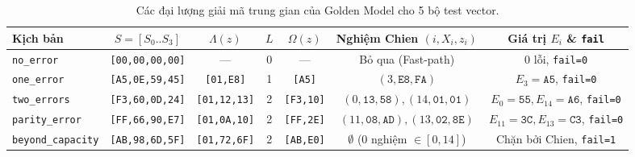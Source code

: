 \begin{table}[!htb]
\centering
\caption{Các đại lượng giải mã trung gian của Golden Model cho 5 bộ test vector.}
\label{tab:vectors_trace_summary}
\scriptsize
\setlength{\tabcolsep}{3.5pt}
\begin{tabular}{@{} l c c c c c c @{}}
\toprule
Kịch bản & $S = [S_0..S_3]$ & $\Lambda(z)$ & $L$ & $\Omega(z)$ & Nghiệm Chien $(i, X_i, z_i)$ & Giá trị $E_i$ \& \texttt{fail} \\
\midrule
\texttt{no\_error} & \texttt{[00,00,00,00]} & --- & 0 & --- & Bỏ qua (Fast-path) & $0$ lỗi, \texttt{fail=0} \\
\texttt{one\_error} & \texttt{[A5,0E,59,45]} & \texttt{[01,E8]} & 1 & \texttt{[A5]} & $(3, \texttt{E8}, \texttt{FA})$ & $E_3=\texttt{A5}$, \texttt{fail=0} \\
\texttt{two\_errors} & \texttt{[F3,60,0D,24]} & \texttt{[01,12,13]} & 2 & \texttt{[F3,10]} & $(0,\texttt{13},\texttt{58}), (14,\texttt{01},\texttt{01})$ & $E_0=\texttt{55}, E_{14}=\texttt{A6}$, \texttt{fail=0} \\
\texttt{parity\_error} & \texttt{[FF,66,90,E7]} & \texttt{[01,0A,10]} & 2 & \texttt{[FF,2E]} & $(11,\texttt{08},\texttt{AD}), (13,\texttt{02},\texttt{8E})$ & $E_{11}=\texttt{3C}, E_{13}=\texttt{C3}$, \texttt{fail=0} \\
\texttt{beyond\_capacity} & \texttt{[AB,98,6D,5F]} & \texttt{[01,72,6F]} & 2 & \texttt{[AB,E0]} & $\emptyset$ (0 nghiệm $\in [0,14]$) & Chặn bởi Chien, \texttt{fail=1} \\
\bottomrule
\end{tabular}
\end{table}


